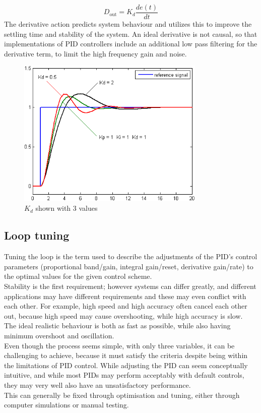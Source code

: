 $$D_{\mathrm{out}}=K_d\frac{de(t)}{dt}$$
The derivative action predicts system behaviour and utilizes this to improve the settling time and stability of the system.
An ideal derivative is not causal, so that implementations of PID controllers include an additional low pass filtering for the derivative term, to limit the high frequency gain and noise.
\begin{figure}[h!]
  \centering
  \includegraphics[width=0.8\textwidth]{figures/Change_with_Kd.png}
  \caption{$K_d$ shown with 3 values} 
  \label{PID controller}
\end{figure}

\newpage

\subsection {Loop tuning} 
Tuning the loop is the term used to describe the adjustments of the PID’s control parameters (proportional band/gain, integral gain/reset, derivative gain/rate) to the optimal values for the given control scheme. \\ Stability is the first requirement; however systems can differ greatly, and different applications may have different requirements and these may even conflict with each other. For example, high speed and high accuracy often cancel each other out, because high speed may cause overshooting, while high accuracy is slow.\\ The ideal realistic behaviour is both as fast as possible, while also having minimum overshoot and oscillation. \\ 

Even though the process seems simple, with only three variables, it can be challenging to achieve, because it must satisfy the criteria despite being within the limitations of PID control. While adjusting the PID can seem conceptually intuitive, and while most PIDs may perform acceptably with default controls, they may very well also have an unsatisfactory performance.\\ This can generally be fixed through optimisation and tuning, either through computer simulations or manual testing.

